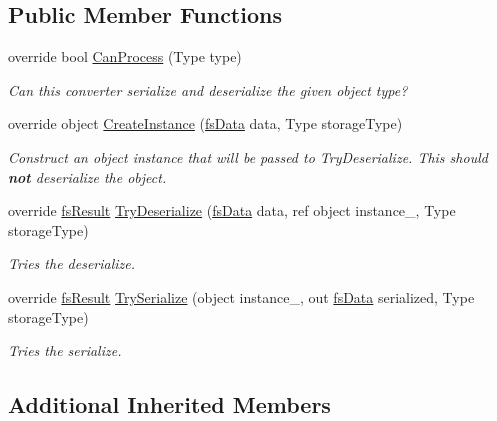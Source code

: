 \subsection*{Public Member Functions}
\begin{DoxyCompactItemize}
\item 
override bool \hyperlink{class_full_serializer_1_1_internal_1_1fs_dictionary_converter_a00582c5fe666a61ae4d528848bdffbd7}{Can\+Process} (Type type)
\begin{DoxyCompactList}\small\item\em Can this converter serialize and deserialize the given object type? \end{DoxyCompactList}\item 
override object \hyperlink{class_full_serializer_1_1_internal_1_1fs_dictionary_converter_aa35564498ee62b6d5e072e845ef0d8f6}{Create\+Instance} (\hyperlink{class_full_serializer_1_1fs_data}{fs\+Data} data, Type storage\+Type)
\begin{DoxyCompactList}\small\item\em Construct an object instance that will be passed to Try\+Deserialize. This should {\bfseries not} deserialize the object. \end{DoxyCompactList}\item 
override \hyperlink{struct_full_serializer_1_1fs_result}{fs\+Result} \hyperlink{class_full_serializer_1_1_internal_1_1fs_dictionary_converter_a8dc0adbffb181451bb37c6e6a0ed13b8}{Try\+Deserialize} (\hyperlink{class_full_serializer_1_1fs_data}{fs\+Data} data, ref object instance\+\_\+, Type storage\+Type)
\begin{DoxyCompactList}\small\item\em Tries the deserialize. \end{DoxyCompactList}\item 
override \hyperlink{struct_full_serializer_1_1fs_result}{fs\+Result} \hyperlink{class_full_serializer_1_1_internal_1_1fs_dictionary_converter_aaeb12dc698fa08caad016cc737f23fff}{Try\+Serialize} (object instance\+\_\+, out \hyperlink{class_full_serializer_1_1fs_data}{fs\+Data} serialized, Type storage\+Type)
\begin{DoxyCompactList}\small\item\em Tries the serialize. \end{DoxyCompactList}\end{DoxyCompactItemize}
\subsection*{Additional Inherited Members}


